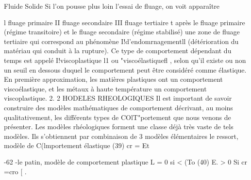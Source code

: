 Fluide Solide Si l'on pousse plus loin l'essai de fluage, on voit apparaître 

l fluage primaire II fluage secondaire III fluage tertiaire 
t 
après le fluage primaire (régime transitoire) et le fluage secondaire (régime stabilisé) une zone de fluage tertiaire qui correspond au phénomène I!d'endom­rnagementll (détérioration du matériau qui conduit à la rupture). 
Ce type de comportement dépendant du temps est appelé I!viscoplasti­que l1 ou "viscoélastiquefl , selon qu'il existe ou non un seuil en dessous du­quel le comportement peut être considéré comme élastique. En première appro­ximation, les matières plastiques ont un comportement viscoélastique, et les métaux à haute température un comportement viscoplastique. 
2. 2 HODELES RHEOLOGIQUES 
Il est important de savoir construire des modèles mathématiques de comportement décrivant, au moins qualitativement, les différents types de COlT"­portement que nous venons de présenter. Les modèles rhéologiques forment une classe déjà très vaste de tels modèles. Ils s'obtiennent par combinaison de 3 modèles élémentaires 
le ressort, modèle de C(lmportement élastique 
(39) cr = Et 

-62 ­-le patin, modèle de comportement plastique 
L = 0 si < (To 
(40) E. > 0 Si cr 
=cro
[ . 

